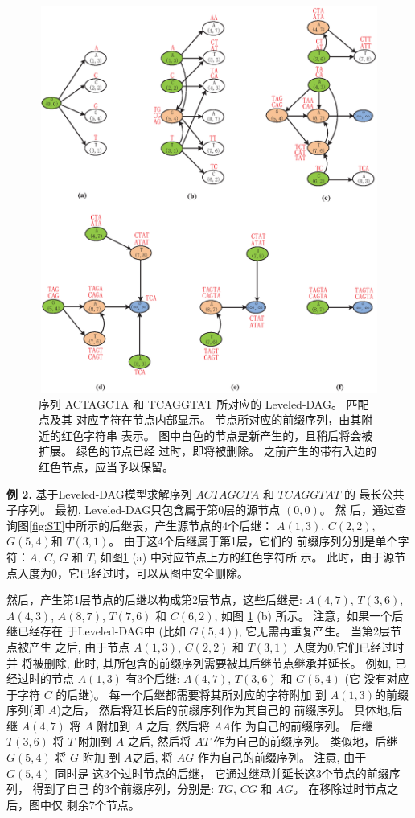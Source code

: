 \begin{figure}[!h]
  \centering
  \includegraphics[height=5in,
  width=5in]{figures/4_MLCS/Leveled_DAG}
  \vspace{1.5em}
  \caption{序列 ACTAGCTA 和 TCAGGTAT 所对应的 Leveled-DAG。 匹配点及其
    对应字符在节点内部显示。 节点所对应的前缀序列，由其附近的红色字符串
    表示。 图中白色的节点是新产生的，且稍后将会被扩展。 绿色的节点已经
    过时，即将被删除。 之前产生的带有入边的红色节点，应当予以保留。}
  \label{fig:Leveled-DAG}
\end{figure}

\textbf{例 2.} 基于Leveled-DAG模型求解序列 $ACTAGCTA$ 和 $TCAGGTAT$ 的
最长公共子序列。 最初, Leveled-DAG只包含属于第0层的源节点 $(0, 0)$。 然
后，通过查询图\ref{fig:ST}中所示的后继表，产生源节点的4个后继： $A(1,
3)$, $C(2, 2)$, $G(5, 4)$和 $T(3, 1)$。 由于这4个后继属于第1层，它们的
前缀序列分别是单个字符：$A$, $C$,
$G$ 和 $T$, 如图\ref{fig:Leveled-DAG} (a) 中对应节点上方的红色字符所
示。 此时，由于源节点入度为0，它已经过时，可以从图中安全删除。

然后，产生第1层节点的后继以构成第2层节点，这些后继是: $A(4, 7)$, $T(3,
6)$, $A(4, 3)$, $A(8, 7)$, $T(7, 6)$ 和 $C(6,
2)$, 如图 \ref{fig:Leveled-DAG} (b) 所示。 注意，如果一个后继已经存在
于Leveled-DAG中 (比如 $G(5, 4)$), 它无需再重复产生。 当第2层节点被产生
之后, 由于节点 $A(1, 3)$, $C(2, 2)$ 和 $T(3, 1)$ 入度为0,它们已经过时并
将被删除, 此时, 其所包含的前缀序列需要被其后继节点继承并延长。 例如, 已
经过时的节点 $A(1, 3)$ 有3个后继: $A(4, 7)$, $T(3, 6)$ 和 $G(5, 4)$ (它
没有对应于字符 $C$ 的后继)。 每一个后继都需要将其所对应的字符附加
到 $A(1, 3)$的前缀序列(即 $A$)之后， 然后将延长后的前缀序列作为其自己的
前缀序列。 具体地,后继 $A(4, 7)$ 将 $A$ 附加到 $A$ 之后, 然后将 $AA$作
为自己的前缀序列。 后继 $T(3, 6)$ 将 $T$ 附加到 $A$ 之后, 然后将 $AT$
作为自己的前缀序列。 类似地，后继 $G(5, 4)$ 将 $G$ 附加
到 $A$之后, 将 $AG$ 作为自己的前缀序列。 注意, 由于 $G(5, 4)$ 同时是
这3个过时节点的后继， 它通过继承并延长这3个节点的前缀序列， 得到了自己
的3个前缀序列，分别是: $TG$, $CG$ 和 $AG$。 在移除过时节点之后，图中仅
剩余7个节点。

